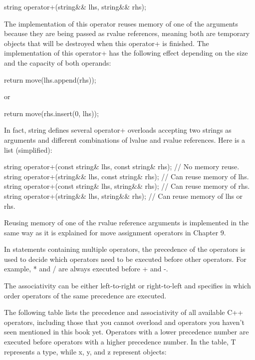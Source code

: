 \begin{cpp}
string operator+(string&& lhs, string&& rhs);
\end{cpp}

The implementation of this operator reuses memory of one of the arguments because they are being passed as rvalue references, meaning both are temporary objects that will be destroyed when this operator+ is finished. The implementation of this operator+ has the following effect depending on the size and the capacity of both operands:

\begin{cpp}
return move(lhs.append(rhs));
\end{cpp}

or

\begin{cpp}
return move(rhs.insert(0, lhs));
\end{cpp}

In fact, string defines several operator+ overloads accepting two strings as arguments and different combinations of lvalue and rvalue references. Here is a list (simplified):

\begin{cpp}
string operator+(const string& lhs, const string& rhs); // No memory reuse.
string operator+(string&& lhs, const string& rhs); // Can reuse memory of lhs.
string operator+(const string& lhs, string&& rhs); // Can reuse memory of rhs.
string operator+(string&& lhs, string&& rhs); // Can reuse memory of lhs or rhs.
\end{cpp}

Reusing memory of one of the rvalue reference arguments is implemented in the same way as it is explained for move assignment operators in Chapter 9.


In statements containing multiple operators, the precedence of the operators is used to decide which operators need to be executed before other operators. For example, * and / are always executed before + and -.

The associativity can be either left-to-right or right-to-left and specifies in which order operators of the same precedence are executed.

The following table lists the precedence and associativity of all available C++ operators, including those that you cannot overload and operators you haven’t seen mentioned in this book yet. Operators with a lower precedence number are executed before operators with a higher precedence number. In the table, T represents a type, while x, y, and z represent objects:

